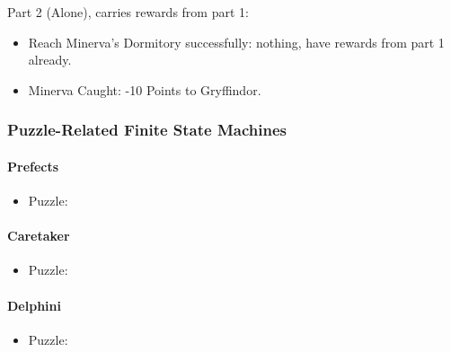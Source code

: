 Part 2 (Alone), carries rewards from part 1:

\begin{itemize}
	\item Reach Minerva's Dormitory successfully: nothing, have rewards from part 1 already.
	\item Minerva Caught: -10 Points to Gryffindor.
\end{itemize}

\pagebreak
\subsubsection{Puzzle-Related Finite State Machines}

\paragraph{Prefects}
\begin{itemize}
\item Puzzle: 
\end{itemize}
\pagebreak

\paragraph{Caretaker}
\begin{itemize}
\item Puzzle: 
\end{itemize}
\pagebreak

\paragraph{Delphini}
\begin{itemize}
\item Puzzle: 
\end{itemize}
\pagebreak